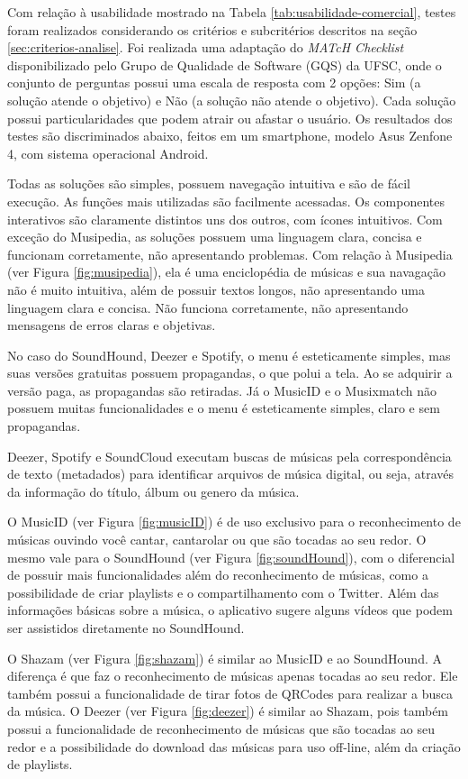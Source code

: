 Com relação à usabilidade mostrado na Tabela \ref{tab:usabilidade-comercial}, testes foram realizados considerando os critérios e subcritérios descritos na seção \ref{sec:criterios-analise}. Foi realizada uma adaptação do \textit{MATcH Checklist} disponibilizado pelo Grupo de Qualidade de Software (GQS) da UFSC, onde o conjunto de perguntas possui uma escala de resposta com 2 opções: Sim (a solução atende o objetivo) e Não (a solução não atende o objetivo). Cada solução possui particularidades que podem atrair ou afastar o usuário. Os resultados dos testes são discriminados abaixo, feitos em um smartphone, modelo Asus Zenfone 4, com sistema operacional Android.

Todas as soluções são simples, possuem navegação intuitiva e são de fácil execução. As funções mais utilizadas são facilmente acessadas. Os componentes interativos são claramente distintos uns dos outros, com ícones intuitivos. Com exceção do Musipedia, as soluções possuem uma linguagem clara, concisa e funcionam corretamente, não apresentando problemas. Com relação à Musipedia (ver Figura \ref{fig:musipedia}), ela é uma enciclopédia de músicas e sua navagação não é muito intuitiva, além de possuir textos longos, não apresentando uma linguagem clara e concisa. Não funciona corretamente, não apresentando mensagens de erros claras e objetivas.

No caso do SoundHound, Deezer e Spotify, o menu é esteticamente simples, mas suas versões gratuitas possuem propagandas, o que polui a tela. Ao se adquirir a versão paga, as propagandas são retiradas. Já o MusicID e o Musixmatch não possuem muitas funcionalidades e o menu é esteticamente simples, claro e sem propagandas.

Deezer, Spotify e SoundCloud executam buscas de músicas pela correspondência de texto (metadados) para identificar arquivos de música digital, ou seja, através da informação do título, álbum ou genero da música.

O MusicID (ver Figura \ref{fig:musicID}) é de uso exclusivo para o reconhecimento de músicas ouvindo você cantar, cantarolar ou que são tocadas ao seu redor. O mesmo vale para o SoundHound (ver Figura \ref{fig:soundHound}), com o diferencial de possuir mais funcionalidades além do reconhecimento de músicas, como a possibilidade de criar playlists e o compartilhamento com o Twitter. Além das informações básicas sobre a música, o aplicativo sugere alguns vídeos que podem ser assistidos diretamente no SoundHound.

O Shazam (ver Figura \ref{fig:shazam}) é similar ao MusicID e ao SoundHound. A diferença é que faz o reconhecimento de músicas apenas tocadas ao seu redor. Ele também possui a funcionalidade de tirar fotos de QRCodes para realizar a busca da música. O Deezer (ver Figura \ref{fig:deezer}) é similar ao Shazam, pois também possui a funcionalidade de reconhecimento de músicas que são tocadas ao seu redor e a possibilidade do download das músicas para uso off-line, além da criação de playlists.

